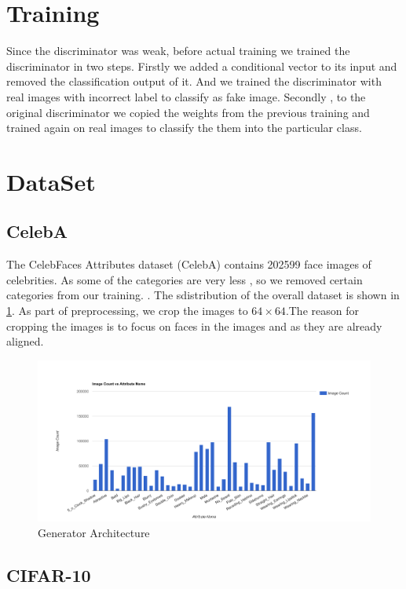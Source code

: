 \section{Training}
Since the discriminator was weak, before actual training we trained the discriminator in two steps. Firstly we added a conditional vector to its input and removed the classification output of it. And we trained the discriminator with real images with incorrect label to classify as fake image. Secondly , to the original discriminator we copied the weights from the previous training and trained again on real images to classify the them into the particular class.  
\section{DataSet}
\subsection{CelebA}
The CelebFaces Attributes dataset (CelebA)\cite{celeba} contains 202599 face images of celebrities. As some of the categories are very less , so we removed certain categories from our training. . The sdistribution of the overall dataset is shown in \cref{fig:celeba}. As part of preprocessing, we crop the images to $64 \times 64$.The reason for cropping the images is to focus on faces in the images and as they are already aligned.


\begin{figure}[H]
  \centering
    \includegraphics[scale=.3, angle=0]{Files/celeba-visualize.png}
    \caption[Generator Architecture]{Generator Architecture\cite{DCGAN}}
    \label{fig:celeba}
\end{figure}
\subsection{CIFAR-10}

